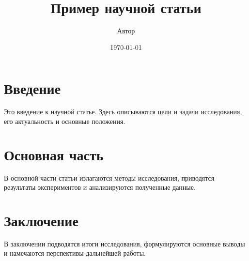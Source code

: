 \documentclass{article}
\title{Пример научной статьи}
\author{Автор}
\date{\today}
\begin{document}
\maketitle

\section{Введение}

Это введение к научной статье. Здесь описываются цели и задачи исследования, его актуальность и основные положения.

\section{Основная часть}

В основной части статьи излагаются методы исследования, приводятся результаты экспериментов и анализируются полученные данные.

\section{Заключение}

В заключении подводятся итоги исследования, формулируются основные выводы и намечаются перспективы дальнейшей работы.
\end{document}
